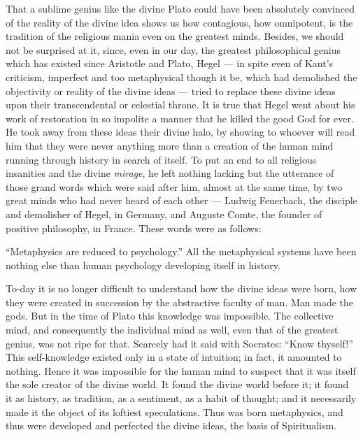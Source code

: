 \documentclass[12pt]{report}
\begin{document}
That a sublime genius like the divine Plato could have been absolutely convinced of the reality of the divine idea shows us how contagious, how omnipotent, is the tradition of the religious mania even on the greatest minds. Besides, we should not be surprised at it, since, even in our day, the greatest philosophical genius which has existed since Aristotle and Plato, Hegel — in spite even of Kant’s criticism, imperfect and too metaphysical though it be, which had demolished the objectivity or reality of the divine ideas — tried to replace these divine ideas upon their transcendental or celestial throne. It is true that Hegel went about his work of restoration in so impolite a manner that he killed the good God for ever. He took away from these ideas their divine halo, by showing to whoever will read him that they were never anything more than a creation of the human mind running through history in search of itself. To put an end to all religious insanities and the divine \emph{mirage}, he left nothing lacking but the utterance of those grand words which were said after him, almost at the same time, by two great minds who had never heard of each other — Ludwig Feuerbach, the disciple and demolisher of Hegel, in Germany, and Auguste Comte, the founder of positive philosophy, in France. These words were as follows:


“Metaphysics are reduced to psychology.” All the metaphysical systems have been nothing else than human psychology developing itself in history.


To-day it is no longer difficult to understand how the divine ideas were born, how they were created in succession by the abstractive faculty of man. Man made the gods. But in the time of Plato this knowledge was impossible. The collective mind, and consequently the individual mind as well, even that of the greatest genius, was not ripe for that. Scarcely had it said with Socrates: “Know thyself!” This self-knowledge existed only in a state of intuition; in fact, it amounted to nothing. Hence it was impossible for the human mind to suspect that it was itself the sole creator of the divine world. It found the divine world before it; it found it as history, as tradition, as a sentiment, as a habit of thought; and it necessarily made it the object of its loftiest speculations. Thus was born metaphysics, and thus were developed and perfected the divine ideas, the basis of Spiritualism.
\end{document}
